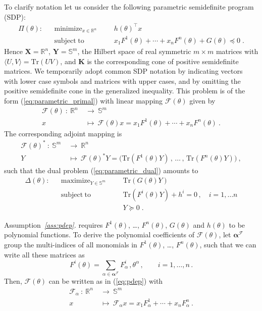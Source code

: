 \documentclass{article}
\DeclareMathOperator*{\minimize}{minimize}
\DeclareMathOperator*{\maximize}{maximize}
\DeclareMathOperator*{\subj}{subject\;to}
\newcommand{\R}{\mathbb{R}}         %
\renewcommand{\S}{\mathbb{S}}       %
\newcommand{\Tr}{\mathrm{Tr}}       %
\renewcommand{\t}{\intercal}        %
\newcommand{\adj}{\ast}                     %
\newcommand{\ppar}{\theta}                          %
\newcommand{\X}{\mathbf{X}}                         %
\newcommand{\Y}{\mathbf{Y}}                         %
\newcommand{\K}{\mathbf{K}}                         %
\newcommand{\calF}{\mathcal{F}}                     %
\newcommand{\Alpha}{\bm{\alpha}}    %
\begin{document}
To clarify notation let us consider the following parametric semidefinite program (SDP):
\[ \begin{aligned}
\Pi(\ppar): && \minimize_{x\in\R^n} &&& h(\ppar)^\t x \\
            && \subj                &&& x_1F^1(\ppar) + \cdots + x_nF^n(\ppar) + G(\ppar) \preceq 0 \;.%
\end{aligned} \]
Hence $\X = \R^n$, $\Y=\S^m$, the Hilbert space of real symmetric $m\times m$ matrices with $\langle U,V\rangle=\Tr(UV)$, and $\K$ is the corresponding cone of positive semidefinite matrices. We temporarily adopt common SDP notation by indicating vectors with lower case symbols and matrices with upper cases, and by omitting the positive semidefinite cone in the generalized inequality. This problem is of the form (\ref{eq:parametric_primal}) with linear mapping $\calF(\ppar)$ given by
\begin{align*}
\calF(\ppar) ~:~ \R^n~ &\rightarrow~ \S^m \\
                  x~ &\mapsto~ \calF(\ppar)x = x_1F^1(\ppar) + \cdots + x_nF^n(\ppar) ~.%
\end{align*}
The corresponding adjoint mapping is
\begin{align*}
\calF(\ppar)^\adj ~:~ \S^m~ &\rightarrow~ \R^n\\
                      Y~ &\mapsto~ \calF(\ppar)^\adj Y = \big(\Tr(F^1(\ppar)Y) \,,\, \ldots \,,\, \Tr(F^n(\ppar)Y)\big) ~,%
\end{align*}
such that the dual problem (\ref{eq:parametric_dual}) amounts to
\[ \begin{aligned}
\Delta(\ppar): && \maximize_{Y\in\S^m} &&& \Tr(G(\ppar)Y) \\
               && \subj                &&& \Tr(F^i(\ppar)Y) + h^i = 0\,,\quad i=1,\ldots n \\%
               &&                      &&& Y \succeq 0 \;.
\end{aligned} \]

Assumption~{\it{}\ref{ass:pdep}.} requires $F^1(\ppar)$, \ldots, $F^n(\ppar)$, $G(\ppar)$ and $h(\ppar)$ to be polynomial functions. To derive the polynomial coefficients of $\calF(\ppar)$, let $\Alpha^\calF$ group the multi-indices of all monomials in $F^1(\ppar)$, \ldots, $F^n(\ppar)$, such that we can write all these matrices as
\[  F^i(\ppar) = \sum_{\alpha\in\Alpha^\calF} F^i_\alpha \,, \ppar^\alpha\,,\qquad i=1,\ldots,n\,.%
\]
Then, $\calF(\ppar)$ can be written as in (\ref{eq:pdep}) with
\begin{align*}
\calF_\alpha ~:~ \R^n~ &\rightarrow~ \S^m \\
                    x~ &\mapsto~ \calF_\alpha x = x_1F^1_\alpha + \cdots + x_nF^n_\alpha ~.%
\end{align*}
\end{document}
